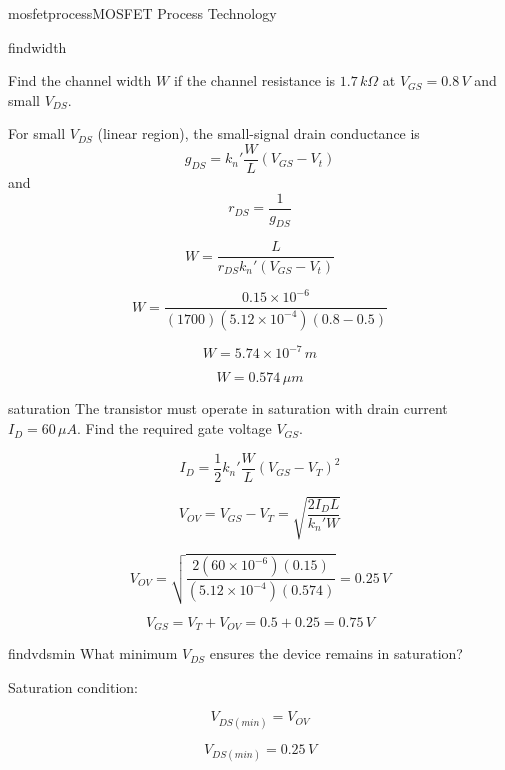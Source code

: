 \begin{mainquestion}{mosfetprocess}{MOSFET Process Technology}
\begin{partquestion}{findwidth}
{Find the channel width $W$ if the channel resistance is $1.7\,k\Omega$ at $V_{GS}=0.8\,V$ and small $V_{DS}$.

For small $V_{DS}$ (linear region), the small-signal drain conductance is
\[
g_{DS}=k_n'\frac{W}{L}(V_{GS}-V_t)
\]
and
\[
r_{DS}=\frac{1}{g_{DS}}
\]}

\begin{answer}
\[
W=\frac{L}{r_{DS}k_n'(V_{GS}-V_t)}
\]

\[
W=\frac{0.15\times10^{-6}}
{(1700)(5.12\times10^{-4})(0.8-0.5)}
\]

\[
W=5.74\times10^{-7}\,m
\]

\[
W=0.574\,\mu m
\]
\end{answer}

\end{partquestion}

\begin{partquestion}{saturation}
{The transistor must operate in saturation with drain current $I_D=60\,\mu A$.  
Find the required gate voltage $V_{GS}$.}

\begin{answer}
\[
I_D=\frac{1}{2}k_n'\frac{W}{L}(V_{GS}-V_T)^2
\]

\[
V_{OV}=V_{GS}-V_T
=\sqrt{\frac{2I_DL}{k_n'W}}
\]

\[
V_{OV}=\sqrt{
\frac{2(60\times10^{-6})(0.15)}
{(5.12\times10^{-4})(0.574)}
}
=0.25\,V
\]

\[
V_{GS}=V_T+V_{OV}
=0.5+0.25
=0.75\,V
\]
\end{answer}

\end{partquestion}

\begin{partquestion}{findvdsmin}
{What minimum $V_{DS}$ ensures the device remains in saturation?}

\begin{answer}
Saturation condition:

\[
V_{DS(min)} = V_{OV}
\]

\[
V_{DS(min)}=0.25\,V
\]
\end{answer}

\end{partquestion}

\end{mainquestion}
